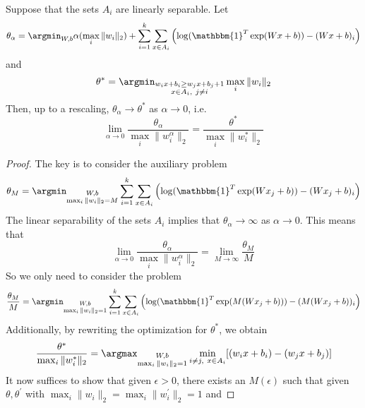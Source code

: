 \begin{theorem}
 Suppose that the sets $A_i$ are linearly separable. Let
 $$\theta_\alpha = \argmin_{W, b} \alpha (\max_i \|w_i\|_2) + \displaystyle\sum_{i=1}^k \displaystyle\sum_{x\in A_i} 
 \left(\log(\mathbbm{1}^T\exp(W x + b)) - (W x + b)_i\right)
 $$
 and
 $$\theta^* = \argmin_{\substack{w_ix + b_i \geq w_jx + b_j + 1\\x\in A_i,~j\neq i}} \max_i \|w_i\|_2$$
 Then, up to a rescaling, $\theta_\alpha \rightarrow \theta^*$ as $\alpha\rightarrow 0$, i.e.
 \begin{equation}
  \lim_{\alpha\rightarrow 0} \frac{\theta_\alpha}{\max_i \|w^\alpha_i\|_2} = \frac{\theta^*}{\max_i \|w^*_i\|_2}
 \end{equation}

\end{theorem}
\begin{proof}
 The key is to consider the auxiliary problem
 \begin{equation}
  \theta_M = \argmin_{\substack{W, b\\\max_i \|w_i\|_2 = M}}\displaystyle\sum_{i=1}^k \displaystyle\sum_{x\in A_i} 
 \left(\log(\mathbbm{1}^T\exp(W x_j + b)) - (W x_j + b)_i\right)
 \end{equation}
 The linear separability of the sets $A_i$ implies that $\theta_\alpha \rightarrow \infty$ as $\alpha\rightarrow 0$.
 This means that
 \begin{equation}
  \lim_{\alpha\rightarrow 0} \frac{\theta_\alpha}{\max_i \|w^\alpha_i\|_2} = \lim_{M\rightarrow \infty} \frac{\theta_M}{M}
 \end{equation}
 So we only need to consider the problem
 \begin{equation}
  \frac{\theta_M}{M} = \argmin_{\substack{W, b\\\max_i \|w_i\|_2 = 1}}\displaystyle\sum_{i=1}^k \displaystyle\sum_{x\in A_i} 
 \left(\log(\mathbbm{1}^T\exp(M(W x_j + b))) - (M(W x_j + b))_i\right)
 \end{equation}
 Additionally, by rewriting the optimization for $\theta^*$, we obtain
 \begin{equation}
  \frac{\theta^*}{\max_i \|w^*_i\|_2} = \argmax_{\substack{W, b\\\max_i \|w_i\|_2 = 1}} \min_{i\neq j,~x\in A_i} [(w_ix + b_i) - (w_jx + b_j)]
 \end{equation}
 It now suffices to show that given $\epsilon > 0$, there exists an $M(\epsilon)$ such that given $\theta, \theta^\prime$ with $\max_i \|w_i\|_2 = \max_i \|w^\prime_i\|_2 = 1$ and

\end{proof}
